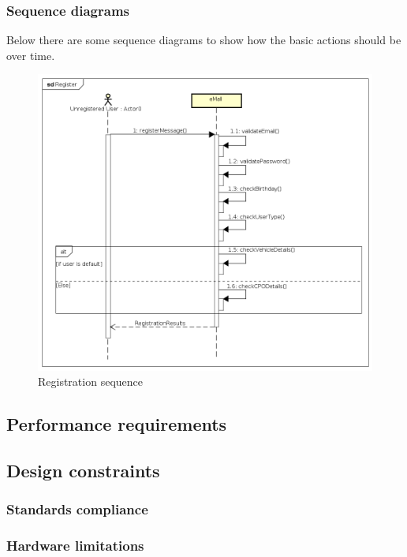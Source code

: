 \subsubsection{Sequence diagrams}
Below there are some sequence diagrams to show how the basic actions should be over time.
\begin{figure}[!htb]
    \begin{center}
        \includegraphics[keepaspectratio, width=16cm]{Sequence/Register.png}
        \caption{Registration sequence}
    \end{center}
\end{figure}
\subsection{Performance requirements}

\subsection{Design constraints}
\subsubsection{Standards compliance}
\subsubsection{Hardware limitations}
